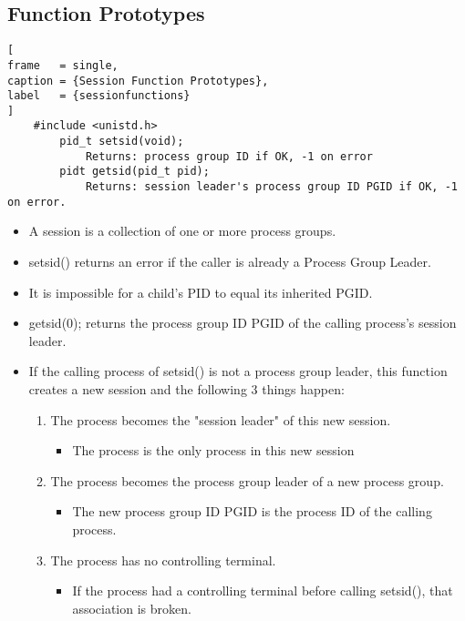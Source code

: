 \documentclass{article}
\begin{document}
\subsection{Function Prototypes}
\begin{lstlisting}[
frame   = single,
caption = {Session Function Prototypes},
label   = {sessionfunctions}
]
    #include <unistd.h>
        pid_t setsid(void);
            Returns: process group ID if OK, -1 on error
        pidt getsid(pid_t pid);
            Returns: session leader's process group ID PGID if OK, -1 on error.
\end{lstlisting}
\begin{itemize}
\item A session is a collection of one or more process groups.
\item setsid() returns an error if the caller is already a Process Group Leader.
\item It is impossible for a child's PID to equal its inherited PGID.
\item getsid(0); returns the process group ID PGID of the calling process's session leader.
\item If the calling process of setsid() is not a process group leader, this function creates a new session and the following 3 things happen:
    \begin{enumerate}
        \item The process becomes the "session leader" of this new session.
            \begin{itemize}
                \item The process is the only process in this new session
            \end{itemize}
        \item The process becomes the process group leader of a new process group.
            \begin{itemize}
                \item The new process group ID PGID is the process ID of the calling process.
            \end{itemize}
        \item The process has no controlling terminal.
            \begin{itemize}
                \item If the process had a controlling terminal before calling setsid(), that association is broken.
            \end{itemize}
    \end{enumerate}
\end{itemize}
\end{document}
